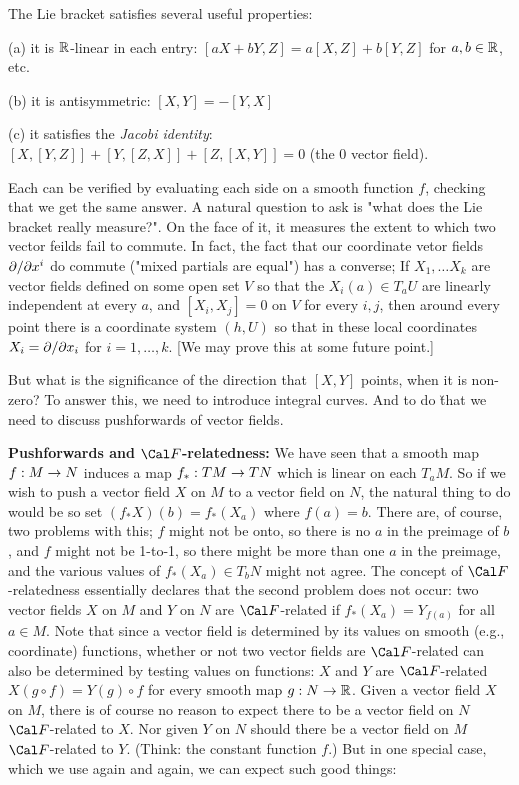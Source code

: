 \msk

The Lie bracket satisfies several useful properties:

(a) it is ${\Bbb R}$-linear in each entry: $[aX+bY,Z] = a[X,Z]+b[Y,Z]$ for $a,b\in {\Bbb R}$, etc.

(b) it is antisymmetric: $[X,Y]=-[Y,X]$

(c) it satisfies the {\it Jacobi identity}: $[X,[Y,Z]]+[Y,[Z,X]]+[Z,[X,Y]]=0$ (the $0$ vector field).

Each can be verified by evaluating each side on a smooth function $f$, checking that we get the same answer.
A natural question to ask is "what does the Lie bracket really measure?". On the face of it, it measures
the extent to which two vector feilds fail to commute. In fact, the fact that our coordinate vetor fields
$\partial/\partial x^i$ do commute ("mixed partials are equal") has a converse; If $X_1,\ldots X_k$ are vector
fields defined on some open set $V$ so that the $X_i(a)\in T_aU$ are linearly independent at every $a$,
and $[X_i,X_j]=0$ on $V$ for every $i,j$, then around every point there is a coordinate system
$(h,U)$ so that in these local coordinates $X_i=\partial/\partial x_i$ for $i=1,\ldots ,k$. [We may
prove this at some future point.]

But what is the significance
of the direction that $[X,Y]$ points, when it is non-zero? To answer this, we need to introduce 
integral curves. And to do \u{that} we need to discuss pushforwards of vector fields.

\msk

{\bf Pushforwards and ${\Cal F}$-relatedness:} We have seen that a smooth map $f:M\rightarrow N$
induces a map $f_*:TM\rightarrow TN$ which is linear on each $T_aM$. So if we wish to push a
vector field $X$ on $M$ to a vector field on $N$, the natural thing to do would be so set
$(f_*X)(b) = f_*(X_a)$ where $f(a)=b$. There are, of course, two problems with this;
$f$ might not be onto, so there is no $a$ in the preimage of $b$, and $f$ might not
 be 1-to-1, so there might be more than one $a$ in the preimage, and the various
values of $f_*(X_a)\in T_bN$ might not agree. The concept of ${\Cal F}$-relatedness
essentially declares that the second problem does not occur: two vector fields
$X$ on $M$ and $Y$ on $N$ are ${\Cal F}$-related if $f_*(X_a)=Y_{f(a)}$ for all $a\in M$.
Note that since a vector field is determined by its values on smooth (e.g., coordinate) functions,
whether or not two vector fields are ${\Cal F}$-related can also be determined
by testing values on functions: $X$ and $Y$ are ${\Cal F}$-related \lra\ $X(g\circ f)=Y(g)\circ f$
for every smooth map $g:N\rightarrow {\Bbb R}$.
Given a vector field $X$ on $M$, there is of course no reason to expect there to be
a vector field on $N$ ${\Cal F}$-related to $X$. Nor given $Y$ on $N$ should
there be a vector field on $M$ ${\Cal F}$-related to $Y$. (Think: the constant function $f$.)
But in one special case, which we use again and again, we can expect such good things:

